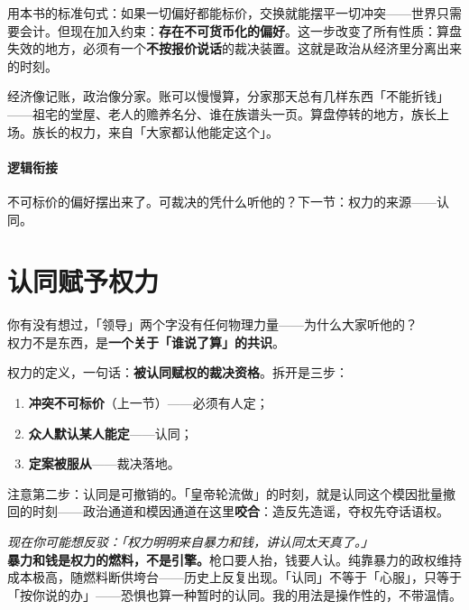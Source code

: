 \documentclass[../../main2.tex]{subfiles}
\begin{document}
用本书的标准句式：如果一切偏好都能标价，交换就能摆平一切冲突——世界只需要会计。但现在加入约束：\textbf{存在不可货币化的偏好}。这一步改变了所有性质：算盘失效的地方，必须有一个\textbf{不按报价说话}的裁决装置。这就是政治从经济里分离出来的时刻。

\begin{tcolorbox}[colback=green!5, title=\textit{生活类比}]
	经济像记账，政治像分家。账可以慢慢算，分家那天总有几样东西「不能折钱」——祖宅的堂屋、老人的赡养名分、谁在族谱头一页。算盘停转的地方，族长上场。族长的权力，来自「大家都认他能定这个」。
\end{tcolorbox}

\paragraph*{逻辑衔接}
	不可标价的偏好摆出来了。可裁决的凭什么听他的？下一节：权力的来源——认同。

\section{认同赋予权力}

\begin{readingnote}
	你有没有想过，「领导」两个字没有任何物理力量——为什么大家听他的？\\
	权力不是东西，是\textbf{一个关于「谁说了算」的共识}。
\end{readingnote}

权力的定义，一句话：\textbf{被认同赋权的裁决资格}。拆开是三步：

\begin{enumerate}
	\item \textbf{冲突不可标价}（上一节）——必须有人定；
	\item \textbf{众人默认某人能定}——认同；
	\item \textbf{定案被服从}——裁决落地。
\end{enumerate}

注意第二步：认同是可撤销的。「皇帝轮流做」的时刻，就是认同这个模因批量撤回的时刻——政治通道和模因通道在这里\textbf{咬合}：造反先造谣，夺权先夺话语权。

\begin{questionbox}
	\textit{现在你可能想反驳：「权力明明来自暴力和钱，讲认同太天真了。」}\\
	\textbf{暴力和钱是权力的燃料，不是引擎。}枪口要人抬，钱要人认。纯靠暴力的政权维持成本极高，随燃料断供垮台——历史上反复出现。「认同」不等于「心服」，只等于「按你说的办」——恐惧也算一种暂时的认同。我的用法是操作性的，不带温情。
\end{questionbox}
\end{document}
